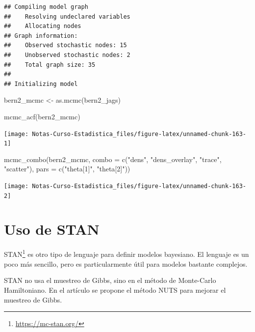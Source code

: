 \documentclass[
  12pt,
]{book}
\newenvironment{Shaded}{\begin{snugshade}}{\end{snugshade}}
\newcommand{\AttributeTok}[1]{\textcolor[rgb]{0.77,0.63,0.00}{#1}}
\newcommand{\FunctionTok}[1]{\textcolor[rgb]{0.00,0.00,0.00}{#1}}
\newcommand{\NormalTok}[1]{#1}
\newcommand{\OtherTok}[1]{\textcolor[rgb]{0.56,0.35,0.01}{#1}}
\newcommand{\StringTok}[1]{\textcolor[rgb]{0.31,0.60,0.02}{#1}}
\theoremstyle{definition}
\theoremstyle{definition}
\theoremstyle{definition}
\theoremstyle{remark}
\begin{document}
\begin{verbatim}
## Compiling model graph
##    Resolving undeclared variables
##    Allocating nodes
## Graph information:
##    Observed stochastic nodes: 15
##    Unobserved stochastic nodes: 2
##    Total graph size: 35
## 
## Initializing model
\end{verbatim}

\begin{Shaded}
\begin{Highlighting}[]
\NormalTok{bern2\_mcmc }\OtherTok{\textless{}{-}} \FunctionTok{as.mcmc}\NormalTok{(bern2\_jags)}

\FunctionTok{mcmc\_acf}\NormalTok{(bern2\_mcmc)}
\end{Highlighting}
\end{Shaded}

\begin{center}\texttt{[image: Notas-Curso-Estadistica\_files/figure-latex/unnamed-chunk-163-1]} \end{center}

\begin{Shaded}
\begin{Highlighting}[]
\FunctionTok{mcmc\_combo}\NormalTok{(bern2\_mcmc, }\AttributeTok{combo =} \FunctionTok{c}\NormalTok{(}\StringTok{"dens"}\NormalTok{, }\StringTok{"dens\_overlay"}\NormalTok{, }
    \StringTok{"trace"}\NormalTok{, }\StringTok{"scatter"}\NormalTok{), }\AttributeTok{pars =} \FunctionTok{c}\NormalTok{(}\StringTok{"theta[1]"}\NormalTok{, }\StringTok{"theta[2]"}\NormalTok{))}
\end{Highlighting}
\end{Shaded}

\begin{center}\texttt{[image: Notas-Curso-Estadistica\_files/figure-latex/unnamed-chunk-163-2]} \end{center}

\hypertarget{uso-de-stan}{%
\section{Uso de STAN}\label{uso-de-stan}}

STAN\footnote{\url{https://mc-stan.org/}} es otro tipo de lenguaje para definir modelos bayesiano. El lenguaje es un poco más sencillo, pero es particularmente útil para modelos bastante complejos.

STAN no usa el muestreo de Gibbs, sino en el método de Monte-Carlo Hamiltoniano. En el artículo \autocite{Hoffman2014} se propone el método NUTS para mejorar el muestreo de Gibbs.
\end{document}
